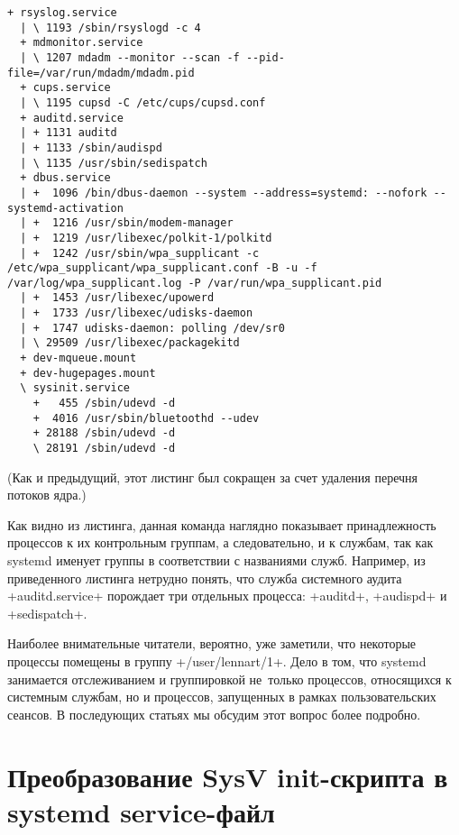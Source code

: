 \documentclass[10pt,oneside,a4paper]{article}
\begin{document}
\begin{landscape}
\begin{Verbatim}[fontsize=\small]
  + rsyslog.service
  | \ 1193 /sbin/rsyslogd -c 4
  + mdmonitor.service
  | \ 1207 mdadm --monitor --scan -f --pid-file=/var/run/mdadm/mdadm.pid
  + cups.service
  | \ 1195 cupsd -C /etc/cups/cupsd.conf
  + auditd.service
  | + 1131 auditd
  | + 1133 /sbin/audispd
  | \ 1135 /usr/sbin/sedispatch
  + dbus.service
  | +  1096 /bin/dbus-daemon --system --address=systemd: --nofork --systemd-activation
  | +  1216 /usr/sbin/modem-manager
  | +  1219 /usr/libexec/polkit-1/polkitd
  | +  1242 /usr/sbin/wpa_supplicant -c /etc/wpa_supplicant/wpa_supplicant.conf -B -u -f /var/log/wpa_supplicant.log -P /var/run/wpa_supplicant.pid
  | +  1453 /usr/libexec/upowerd
  | +  1733 /usr/libexec/udisks-daemon
  | +  1747 udisks-daemon: polling /dev/sr0
  | \ 29509 /usr/libexec/packagekitd
  + dev-mqueue.mount
  + dev-hugepages.mount
  \ sysinit.service
    +   455 /sbin/udevd -d
    +  4016 /usr/sbin/bluetoothd --udev
    + 28188 /sbin/udevd -d
    \ 28191 /sbin/udevd -d
\end{Verbatim}
(Как и предыдущий, этот листинг был сокращен за счет удаления перечня потоков
ядра.)
\end{landscape}

Как видно из листинга, данная команда наглядно показывает принадлежность
процессов к их контрольным группам, а следовательно, и к службам, так как
systemd именует группы в соответствии с названиями служб. Например, из
приведенного листинга нетрудно понять, что служба системного аудита
+auditd.service+ порождает три отдельных процесса: +auditd+,
+audispd+ и +sedispatch+.

Наиболее внимательные читатели, вероятно, уже заметили, что некоторые процессы
помещены в группу +/user/lennart/1+. Дело в том, что systemd занимается
отслеживанием и группировкой не~только процессов, относящихся к системным
службам, но и процессов, запущенных в рамках пользовательских сеансов. В
последующих статьях мы обсудим этот вопрос более подробно. 

\section{Преобразование SysV init-скрипта в systemd service-файл}
\label{sec:convert}
\end{document}
